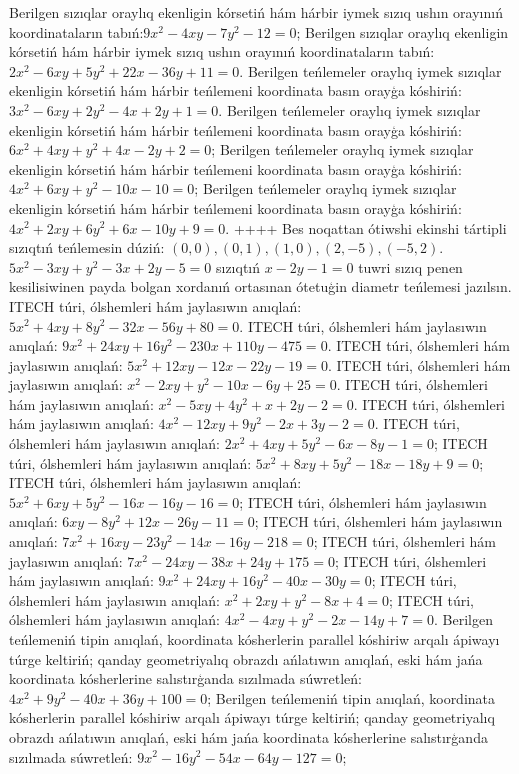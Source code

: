 Berilgen sızıqlar oraylıq ekenligin kórsetiń hám hárbir iymek sızıq ushın orayınıń koordinataların tabıń:$9 x^2-4 x y-7 y^2-12=0$;
Berilgen sızıqlar oraylıq ekenligin kórsetiń hám hárbir iymek sızıq ushın orayınıń koordinataların tabıń: $2 x^2-6 x y+5 y^2+22 x-36 y+11=0$.
Berilgen teńlemeler oraylıq iymek sızıqlar ekenligin kórsetiń hám hárbir teńlemeni koordinata basın orayģa kóshiriń: $3x^2-6xy+2y^2-4x+2y+1=0$.
Berilgen teńlemeler oraylıq iymek sızıqlar ekenligin kórsetiń hám hárbir teńlemeni koordinata basın orayģa kóshiriń: $6 x^2+4 x y+y^2+4 x-2 y+2=0$;
Berilgen teńlemeler oraylıq iymek sızıqlar ekenligin kórsetiń hám hárbir teńlemeni koordinata basın orayģa kóshiriń: $4 x^2+6 x y+y^2-10 x-10=0$;
Berilgen teńlemeler oraylıq iymek sızıqlar ekenligin kórsetiń hám hárbir teńlemeni koordinata basın orayģa kóshiriń:  $4 x^2+2 x y+6 y^2+6 x-10 y+9=0$.
++++
Bes noqattan ótiwshi ekinshi tártipli sızıqtıń teńlemesin dúziń: $(0,0),(0,1),(1,0),(2,-5),(-5,2)$.
$5 x^2-3 x y+y^2-3 x+2 y-5=0$ sızıqtıń $x-2 y-1=0$ tuwri sızıq penen kesilisiwinen payda bolgan xordanıń ortasınan ótetuģin diametr teńlemesi jazılsın.
ITECH túri, ólshemleri hám jaylasıwın anıqlań: $5 x^2+4 x y+8 y^2-32 x-56 y+80=0$.
ITECH túri, ólshemleri hám jaylasıwın anıqlań: $9 x^2+24 x y+16 y^2-230 x+110 y-475=0$.
ITECH túri, ólshemleri hám jaylasıwın anıqlań: $5 x^2+12 x y-12 x-22 y-19=0$.
ITECH túri, ólshemleri hám jaylasıwın anıqlań: $x^2-2 x y+y^2-10 x-6 y+25=0$.
ITECH túri, ólshemleri hám jaylasıwın anıqlań: $x^2-5 x y+4 y^2+x+2 y-2=0$.
ITECH túri, ólshemleri hám jaylasıwın anıqlań: $4 x^2-12 x y+9 y^2-2 x+3 y-2=0$.
ITECH túri, ólshemleri hám jaylasıwın anıqlań: $2 x^2+4 x y+5 y^2-6 x-8 y-1=0$;
ITECH túri, ólshemleri hám jaylasıwın anıqlań: $5 x^2+8 x y+5 y^2-18 x-18 y+9=0$;
ITECH túri, ólshemleri hám jaylasıwın anıqlań: $5 x^2+6 x y+5 y^2-16 x-16 y-16=0$;
ITECH túri, ólshemleri hám jaylasıwın anıqlań: $6 x y-8 y^2+12 x-26 y-11=0$;
ITECH túri, ólshemleri hám jaylasıwın anıqlań: $7 x^2+16 x y-23 y^2-14 x-16 y-218=0$;
ITECH túri, ólshemleri hám jaylasıwın anıqlań: $7 x^2-24 x y-38 x+24 y+175=0$;
ITECH túri, ólshemleri hám jaylasıwın anıqlań: $9 x^2+24 x y+16 y^2-40 x-30 y=0$;
ITECH túri, ólshemleri hám jaylasıwın anıqlań: $x^2+2 x y+y^2-8 x+4=0$;
ITECH túri, ólshemleri hám jaylasıwın anıqlań: $4 x^2-4 x y+y^2-2 x-14 y+7=0$.
Berilgen teńlemeniń tipin anıqlań, koordinata kósherlerin parallel kóshiriw arqalı ápiwayı túrge keltiriń; qanday geometriyalıq obrazdı ańlatıwın anıqlań, eski hám jańa koordinata kósherlerine salıstırģanda sızılmada súwretleń: $4 x^2+9 y^2-40 x+36 y+100=0$;
Berilgen teńlemeniń tipin anıqlań, koordinata kósherlerin parallel kóshiriw arqalı ápiwayı túrge keltiriń; qanday geometriyalıq obrazdı ańlatıwın anıqlań, eski hám jańa koordinata kósherlerine salıstırģanda sızılmada súwretleń: $9 x^2-16 y^2-54 x-64 y-127=0$;
